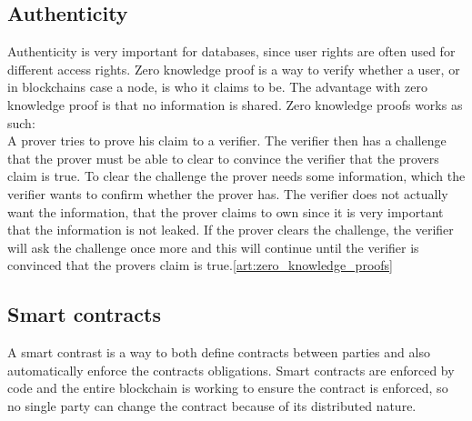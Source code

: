 \subsection{Authenticity}
Authenticity is very important for databases, since user rights are often used for different access rights. Zero knowledge proof is a way to verify whether a user, or in blockchains case a node, is who it claims to be. The advantage with zero knowledge proof is that no information is shared. Zero knowledge proofs works as such:\\
A prover tries to prove his claim to a verifier. The verifier then has a challenge that the prover must be able to clear to convince the verifier that the provers claim is true. To clear the challenge the prover needs some information, which the verifier wants to confirm whether the prover has. The verifier does not actually want the information, that the prover claims to own since it is very important that the information is not leaked. If the prover clears the challenge, the verifier will ask the challenge once more and this will continue until the verifier is convinced that the provers claim is true.\ref{art:zero_knowledge_proofs}



\subsection{Smart contracts}
A smart contrast is a way to both define contracts between parties and also automatically enforce the contracts obligations. Smart contracts are enforced by code and the entire blockchain is working to ensure the contract is enforced, so no single party can change the contract because of its distributed nature\cite{website:blockchaintechnologies}.
